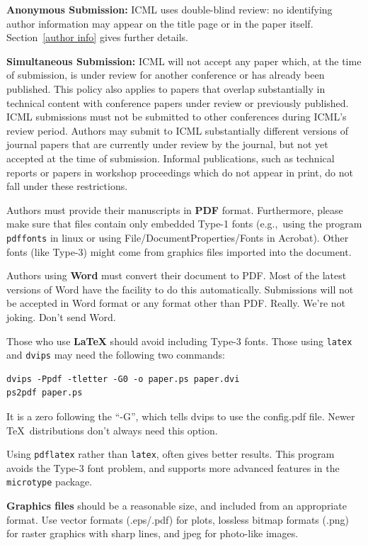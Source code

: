 \documentclass{article}
\begin{document}
\textbf{Anonymous Submission:} ICML uses double-blind review: no identifying
author information may appear on the title page or in the paper
itself. Section~\ref{author info} gives further details.

\textbf{Simultaneous Submission:} ICML will not accept any paper which,
at the time of submission, is under review for another conference or
has already been published. This policy also applies to papers that
overlap substantially in technical content with conference papers
under review or previously published. ICML submissions must not be
submitted to other conferences during ICML's review period. Authors
may submit to ICML substantially different versions of journal papers
that are currently under review by the journal, but not yet accepted
at the time of submission. Informal publications, such as technical
reports or papers in workshop proceedings which do not appear in
print, do not fall under these restrictions.

\medskip

Authors must provide their manuscripts in \textbf{PDF} format.
Furthermore, please make sure that files contain only embedded Type-1 fonts
(e.g.,~using the program \texttt{pdffonts} in linux or using
File/DocumentProperties/Fonts in Acrobat). Other fonts (like Type-3)
might come from graphics files imported into the document.

Authors using \textbf{Word} must convert their document to PDF\@. Most
of the latest versions of Word have the facility to do this
automatically. Submissions will not be accepted in Word format or any
format other than PDF\@. Really. We're not joking. Don't send Word.

Those who use \textbf{\LaTeX} should avoid including Type-3 fonts.
Those using \texttt{latex} and \texttt{dvips} may need the following
two commands:

{\footnotesize
\begin{verbatim}
dvips -Ppdf -tletter -G0 -o paper.ps paper.dvi
ps2pdf paper.ps
\end{verbatim}}
It is a zero following the ``-G'', which tells dvips to use
the config.pdf file. Newer \TeX\ distributions don't always need this
option.

Using \texttt{pdflatex} rather than \texttt{latex}, often gives better
results. This program avoids the Type-3 font problem, and supports more
advanced features in the \texttt{microtype} package.

\textbf{Graphics files} should be a reasonable size, and included from
an appropriate format. Use vector formats (.eps/.pdf) for plots,
lossless bitmap formats (.png) for raster graphics with sharp lines, and
jpeg for photo-like images.
\end{document}
